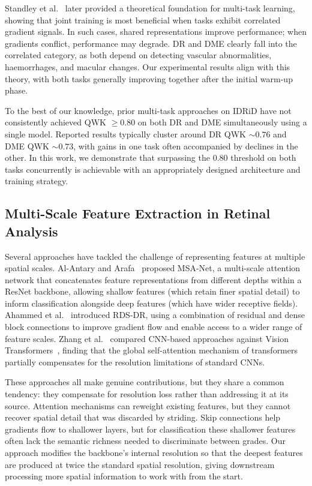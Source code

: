 \documentclass[12pt,a4paper]{article}
\begin{document}
Standley et al.~\cite{Standley2020} later provided a theoretical foundation for multi-task learning, showing that joint training is most beneficial when tasks exhibit correlated gradient signals. In such cases, shared representations improve performance; when gradients conflict, performance may degrade. DR and DME clearly fall into the correlated category, as both depend on detecting vascular abnormalities, haemorrhages, and macular changes. Our experimental results align with this theory, with both tasks generally improving together after the initial warm-up phase.

To the best of our knowledge, prior multi-task approaches on IDRiD have not consistently achieved QWK $\geq 0.80$ on both DR and DME simultaneously using a single model. Reported results typically cluster around DR QWK $\sim 0.76$ and DME QWK $\sim 0.73$, with gains in one task often accompanied by declines in the other. In this work, we demonstrate that surpassing the 0.80 threshold on both tasks concurrently is achievable with an appropriately designed architecture and training strategy.

\subsection{Multi-Scale Feature Extraction in Retinal Analysis}

Several approaches have tackled the challenge of representing features at multiple spatial scales. Al-Antary and Arafa~\cite{AlAntary2021} proposed MSA-Net, a multi-scale attention network that concatenates feature representations from different depths within a ResNet backbone, allowing shallow features (which retain finer spatial detail) to inform classification alongside deep features (which have wider receptive fields). Ahammed et al.~\cite{Ahammed2023} introduced RDS-DR, using a combination of residual and dense block connections to improve gradient flow and enable access to a wider range of feature scales. Zhang et al.~\cite{Zhang2024} compared CNN-based approaches against Vision Transformers~\cite{Dosovitskiy2021ViT}, finding that the global self-attention mechanism of transformers partially compensates for the resolution limitations of standard CNNs.

These approaches all make genuine contributions, but they share a common tendency: they compensate for resolution loss rather than addressing it at its source. Attention mechanisms can reweight existing features, but they cannot recover spatial detail that was discarded by striding. Skip connections help gradients flow to shallower layers, but for classification these shallower features often lack the semantic richness needed to discriminate between grades. Our approach modifies the backbone's internal resolution so that the deepest features are produced at twice the standard spatial resolution, giving downstream processing more spatial information to work with from the start.
\end{document}
